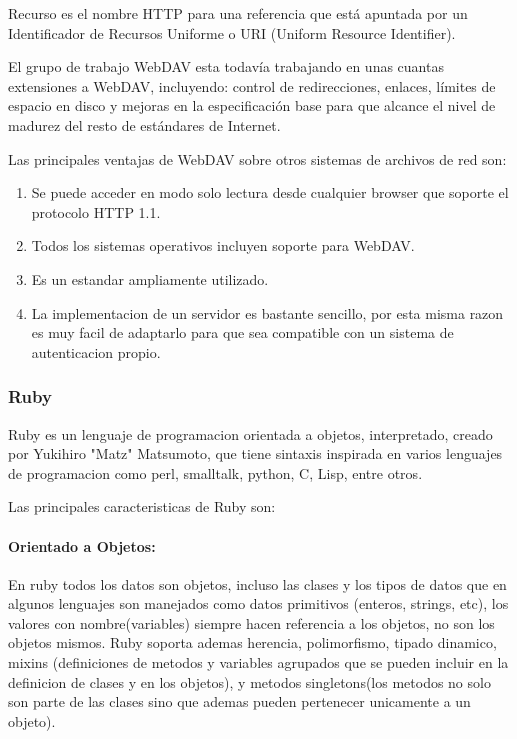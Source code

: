 Recurso es el nombre HTTP para una referencia que está apuntada por un Identificador de Recursos Uniforme o URI (Uniform Resource Identifier).

El grupo de trabajo WebDAV esta todavía trabajando en unas cuantas extensiones a WebDAV, incluyendo: control de redirecciones, enlaces, límites de espacio en disco y mejoras en la especificación base para que alcance el nivel de madurez del resto de estándares de Internet.

Las principales ventajas de WebDAV sobre otros sistemas de archivos de red son:

\begin{enumerate}

	\item Se puede acceder en modo solo lectura desde cualquier browser que soporte el protocolo HTTP 1.1.
	
	\item Todos los sistemas operativos incluyen soporte para WebDAV.
	
	\item Es un estandar ampliamente utilizado.
	
	\item La implementacion de un servidor es bastante sencillo, por esta misma razon es muy facil de adaptarlo para que sea compatible con un sistema de autenticacion propio.

\end{enumerate}


\subsubsection*{Ruby \cite{ruby_lang} }

Ruby es un lenguaje de programacion orientada a objetos, interpretado, creado por Yukihiro "Matz" Matsumoto, que tiene sintaxis inspirada en varios lenguajes de programacion como perl, smalltalk, python, C, Lisp, entre otros.

Las principales caracteristicas de Ruby son:

\paragraph{Orientado a Objetos:}
En ruby todos los datos son objetos, incluso las clases y los tipos de datos que en algunos lenguajes son manejados como datos primitivos (enteros, strings, etc), los valores con nombre(variables) siempre hacen referencia a los objetos, no son los objetos mismos. \newline Ruby soporta ademas herencia, polimorfismo, tipado dinamico, mixins (definiciones de metodos y variables agrupados que se pueden incluir en la definicion de clases y en los objetos), y metodos singletons(los metodos no solo son parte de las clases sino que ademas pueden pertenecer unicamente a un objeto).


